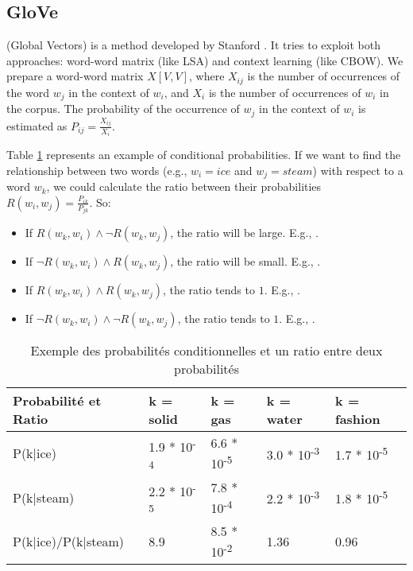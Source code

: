 \documentclass{KBook}
\begin{document}
\subsection{GloVe}

 (Global Vectors) is a method developed by Stanford \cite{2014-pennington-al}. It tries to exploit both approaches: word-word matrix (like LSA) and context learning (like CBOW).
We prepare a word-word matrix $X[V, V]$, where $X_{ij}$ is the number of occurrences of the word $w_j$ in the context of $w_i$, and $X_i$ is the number of occurrences of $w_i$ in the corpus. The probability of the occurrence of $w_j$ in the context of $w_i$ is estimated as $P_{ij}= \frac{X_{ij}}{X_i}$.

Table \ref{tab:glove-prob-exp} represents an example of conditional probabilities.
If we want to find the relationship between two words (e.g., $w_i = ice$ and $w_j = steam$) with respect to a word $w_k$, we could calculate the ratio between their probabilities $R(w_i, w_j) = \frac{P_{ik}}{P_{jk}}$. So:
\begin{itemize}
	\item If $R(w_k, w_i) \wedge \neg R(w_k, w_j)$, the ratio will be large. E.g., .
	\item If $\neg R(w_k, w_i) \wedge R(w_k, w_j)$, the ratio will be small. E.g., .
	\item If $R(w_k, w_i) \wedge R(w_k, w_j)$, the ratio tends to $1$. E.g., .
	\item If $\neg R(w_k, w_i) \wedge \neg R(w_k, w_j)$, the ratio tends to $1$. E.g., .
\end{itemize}

\begin{table}[ht]
	\centering
	\begin{tabular}{lllll}
		\hline\hline
		\textbf{Probabilité et Ratio} & \textbf{k = solid} & \textbf{k = gas} & \textbf{k = water} & \textbf{k = fashion} \\
		\hline
		P(k|ice) & 1.9 * 10\textsuperscript{-4} & 6.6 * 10\textsuperscript{-5} & 3.0 * 10\textsuperscript{-3} & 1.7 * 10\textsuperscript{-5} \\
		P(k|steam) & 2.2 * 10\textsuperscript{-5} & 7.8 * 10\textsuperscript{-4} & 2.2 * 10\textsuperscript{-3} & 1.8 * 10\textsuperscript{-5} \\
		\hline
		P(k|ice)/P(k|steam) & 8.9 & 8.5 * 10\textsuperscript{-2} & 1.36 & 0.96 \\
		\hline\hline
		
	\end{tabular}
	\caption[Exemple des probabilités conditionnelles et un ratio entre deux probabilités]{Exemple des probabilités conditionnelles et un ratio entre deux probabilités  \cite{2014-pennington-al}}
	\label{tab:glove-prob-exp}
\end{table}
\end{document}
